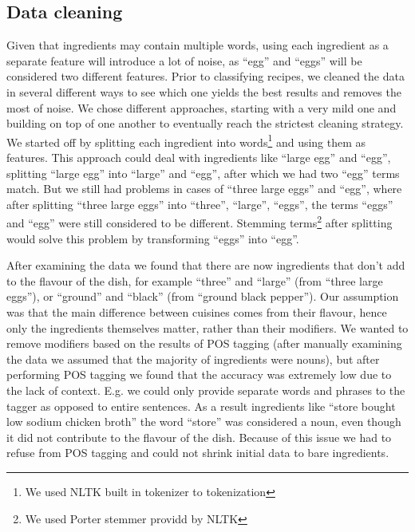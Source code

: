 \documentclass[prodmode,acmtap]{acmlarge}
\begin{document}
\subsection{Data cleaning}
Given that ingredients may contain multiple words, using each ingredient as a separate feature will introduce a lot of noise, as “egg” and “eggs” will be considered two different features. Prior to classifying recipes, we cleaned the data in several different ways to see which one yields the best results and removes the most of noise. We chose different approaches, starting with a very mild one and building on top of one another to eventually reach the strictest cleaning strategy. 
We started off by splitting each ingredient into words\footnote{We used NLTK built in tokenizer to tokenization} and using them as features. This approach could deal with ingredients like ``large egg'' and ``egg'', splitting ``large egg'' into ``large'' and ``egg'', after which we had two ``egg'' terms match. 
But we still had problems in cases of ``three large eggs'' and ``egg'', where after splitting ``three large eggs'' into ``three'', ``large'', ``eggs'', the terms ``eggs'' and ``egg'' were still considered to be different. Stemming terms\footnote{We used Porter stemmer providd by NLTK} after splitting would solve this problem by transforming ``eggs'' into ``egg''. 

After examining the data we found that there are now ingredients that don’t add to the flavour of the dish, for example ``three'' and ``large'' (from ``three large eggs''), or ``ground'' and ``black'' (from ``ground black pepper''). Our assumption was that the main difference between cuisines comes from their flavour, hence only the ingredients themselves matter, rather than their modifiers. We wanted to remove modifiers based on the results of POS tagging (after manually examining the data we assumed that the majority of ingredients were nouns), but after performing POS tagging we found that the accuracy was extremely low due to the lack of context. E.g. we could only provide separate words and phrases to the tagger as opposed to entire sentences. As a result ingredients like ``store bought low sodium chicken broth'' the word ``store'' was considered a noun, even though it did not contribute to the flavour of the dish. Because of this issue we had to refuse from POS tagging and could not shrink initial data to bare ingredients. 
\end{document}
